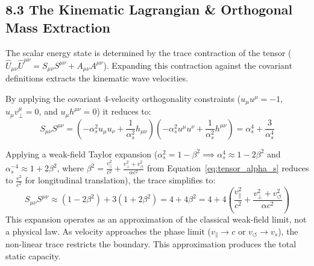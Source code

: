 \subsection*{8.3 The Kinematic Lagrangian \& Orthogonal Mass Extraction}
The scalar energy state is determined by the trace contraction of the tensor ($\hat{U}_{\mu\nu} \hat{U}^{\mu\nu} = S_{\mu\nu}S^{\mu\nu} + A_{\mu\nu}A^{\mu\nu}$). Expanding this contraction against the covariant definitions extracts the kinematic wave velocities. 

By applying the covariant 4-velocity orthogonality constraints ($u_\mu u^\mu = -1$, $u_\mu v^\mu_{\perp} = 0$, and $u_\mu h^{\mu\nu} = 0$) it reduces to:
\begin{equation}
    S_{\mu\nu}S^{\mu\nu} = \left(-\alpha_s^2 u_\mu u_\nu + \frac{1}{\alpha_s^2}h_{\mu\nu}\right)\left(-\alpha_s^2 u^\mu u^\nu + \frac{1}{\alpha_s^2}h^{\mu\nu}\right) = \alpha_s^4 + \frac{3}{\alpha_s^4}
\end{equation}

Applying a weak-field Taylor expansion ($\alpha_s^2 = 1 - \beta^2 \implies \alpha_s^4 \approx 1 - 2\beta^2$ and $\alpha_s^{-4} \approx 1 + 2\beta^2$, where $\beta^2 = \frac{v_\parallel^2}{c^2} + \frac{v_\perp^2 + v_\circlearrowleft^2}{\alpha c^2}$ from Equation~\ref{eq:tensor_alpha_s} reduces to $\frac{v^2}{c^2}$ for longitudinal translation), the trace simplifies to: %
\begin{equation}
    S_{\mu\nu}S^{\mu\nu} \approx (1 - 2\beta^2) + 3(1 + 2\beta^2) = 4 + 4\beta^2 = 4 + 4\left(\frac{v_\parallel^2}{c^2} + \frac{v_\perp^2 + v_\circlearrowleft^2}{\alpha c^2}\right) %
\end{equation}
This expansion operates as an approximation of the classical weak-field limit, not a physical law. As velocity approaches the phase limit ($v_\parallel \to c$ or $v_\circlearrowleft \to v_s$), the non-linear trace restricts the boundary. This approximation produces the total static capacity. %

